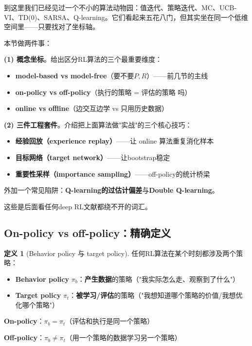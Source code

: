 \documentclass[11pt,a4paper]{article}
\theoremstyle{definition}
\newtheorem{definition}{定义}[section]
\begin{document}
\begin{plainwords}
到这里我们已经见过一个不小的算法动物园：值迭代、策略迭代、MC、UCB-VI、TD(0)、SARSA、Q-learning。它们看起来五花八门，但其实坐在同一个低维空间里——只要找对了坐标轴。

本节做两件事：

\textbf{(1) 概念坐标}。给出区分RL算法的三个最重要维度：
\begin{itemize}
\item \textbf{model-based vs model-free}（要不要$P, R$）——前几节的主线
\item \textbf{on-policy vs off-policy}（执行的策略 = 评估的策略 吗）
\item \textbf{online vs offline}（边交互边学 vs 只用历史数据）
\end{itemize}

\textbf{(2) 三件工程套件}。介绍把上面算法做"实战"的三个核心技巧：
\begin{itemize}
\item \textbf{经验回放（experience replay）}——让 online 算法重复消化样本
\item \textbf{目标网络（target network）}——让bootstrap稳定
\item \textbf{重要性采样（importance sampling）}——off-policy的统计桥梁
\end{itemize}

外加一个常见陷阱：\textbf{Q-learning的过估计偏差}与\textbf{Double Q-learning}。

这些是后面看任何deep RL文献都绕不开的词汇。
\end{plainwords}

\subsection{On-policy vs off-policy：精确定义}

\begin{definition}[Behavior policy 与 target policy]
任何RL算法在某个时刻都涉及两个策略：
\begin{itemize}
\item \textbf{Behavior policy} $\pi_b$：\textbf{产生数据}的策略（"我实际怎么走、观察到了什么"）
\item \textbf{Target policy} $\pi_t$：\textbf{被学习/评估}的策略（"我想知道哪个策略的价值/我想优化哪个策略"）
\end{itemize}

\textbf{On-policy}：$\pi_b = \pi_t$（评估和执行是同一个策略）

\textbf{Off-policy}：$\pi_b \neq \pi_t$（用一个策略的数据学习另一个策略）
\end{definition}
\end{document}
